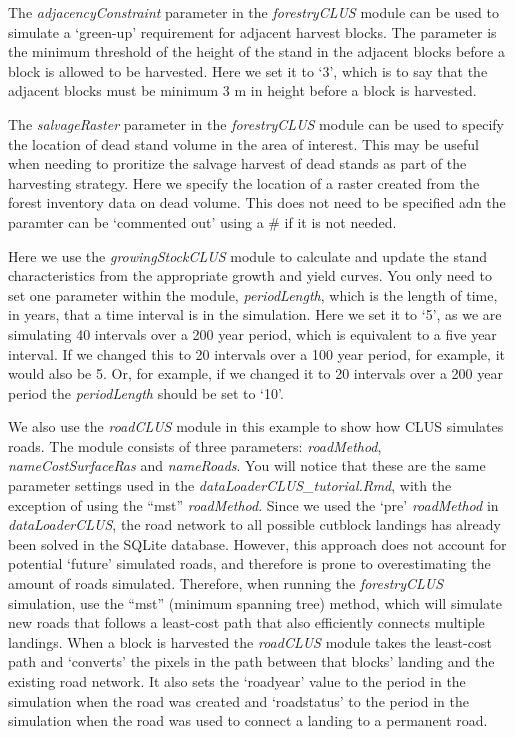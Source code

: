 \documentclass[
]{article}
\begin{document}
The \emph{adjacencyConstraint} parameter in the \emph{forestryCLUS}
module can be used to simulate a `green-up' requirement for adjacent
harvest blocks. The parameter is the minimum threshold of the height of
the stand in the adjacent blocks before a block is allowed to be
harvested. Here we set it to `3', which is to say that the adjacent
blocks must be minimum 3 m in height before a block is harvested.

The \emph{salvageRaster} parameter in the \emph{forestryCLUS} module can
be used to specify the location of dead stand volume in the area of
interest. This may be useful when needing to proritize the salvage
harvest of dead stands as part of the harvesting strategy. Here we
specify the location of a raster created from the forest inventory data
on dead volume. This does not need to be specified adn the paramter can
be `commented out' using a \# if it is not needed.

Here we use the \emph{growingStockCLUS} module to calculate and update
the stand characteristics from the appropriate growth and yield curves.
You only need to set one parameter within the module,
\emph{periodLength}, which is the length of time, in years, that a time
interval is in the simulation. Here we set it to `5', as we are
simulating 40 intervals over a 200 year period, which is equivalent to a
five year interval. If we changed this to 20 intervals over a 100 year
period, for example, it would also be 5. Or, for example, if we changed
it to 20 intervals over a 200 year period the \emph{periodLength} should
be set to `10'.

We also use the \emph{roadCLUS} module in this example to show how CLUS
simulates roads. The module consists of three parameters:
\emph{roadMethod}, \emph{nameCostSurfaceRas} and \emph{nameRoads}. You
will notice that these are the same parameter settings used in the
\emph{dataLoaderCLUS\_tutorial.Rmd}, with the exception of using the
``mst'' \emph{roadMethod}. Since we used the `pre' \emph{roadMethod} in
\emph{dataLoaderCLUS}, the road network to all possible cutblock
landings has already been solved in the SQLite database. However, this
approach does not account for potential `future' simulated roads, and
therefore is prone to overestimating the amount of roads simulated.
Therefore, when running the \emph{forestryCLUS} simulation, use the
``mst'' (minimum spanning tree) method, which will simulate new roads
that follows a least-cost path that also efficiently connects multiple
landings. When a block is harvested the \emph{roadCLUS} module takes the
least-cost path and `converts' the pixels in the path between that
blocks' landing and the existing road network. It also sets the
`roadyear' value to the period in the simulation when the road was
created and `roadstatus' to the period in the simulation when the road
was used to connect a landing to a permanent road.
\end{document}
